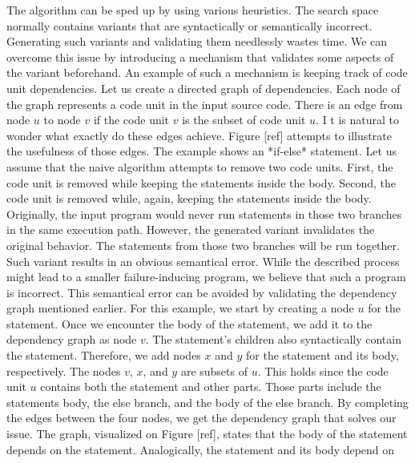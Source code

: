 The algorithm can be sped up by using various heuristics. 
The search space normally contains variants that are syntactically or 
semantically incorrect. 
Generating such variants and validating them needlessly wastes time. 
We can overcome this issue by introducing a mechanism that validates some 
aspects of the variant beforehand. 
An example of such a mechanism is keeping track of code unit dependencies. 
Let us create a directed graph of dependencies. 
Each node of the graph represents a code unit in the input source code. 
There is an edge from node $u$ to node $v$ if the code unit $v$ is 
the subset of code unit $u$. I
t is natural to wonder what exactly do these edges achieve. 
Figure [ref] attempts to illustrate the usefulness of those edges. 
The example shows an *if-else* statement. 
Let us assume that the naive algorithm attempts to remove two code units. 
First, the code unit  is removed while keeping the statements 
inside the body. 
Second, the code unit  is removed while, again, keeping 
the statements inside the body. 
Originally, the input program would never run statements in those two 
branches in the same execution path. 
However, the generated variant invalidates the original behavior. 
The statements from those two branches will be run together. 
Such variant results in an obvious semantical error. 
While the described process might lead to a smaller failure-inducing program, 
we believe that such a program is incorrect. 
This semantical error can be avoided by validating the dependency graph 
mentioned earlier.
For this example, we start by creating a node $u$ for the  
statement. 
Once we encounter the body of the  statement, we add it to 
the dependency graph as node $v$. 
The  statement's children also syntactically contain 
the  statement. 
Therefore, we add nodes $x$ and $y$ for the  statement and 
its body, respectively. 
The nodes $v$, $x$, and $y$ are subsets of $u$.  
This holds since the code unit $u$ contains both the  
statement and other parts. 
Those parts include the statements body, the else branch, and the body of 
the else branch. 
By completing the edges between the four nodes, we get the dependency graph 
that solves our issue. 
The graph, visualized on Figure [ref], states that the body of 
the  statement depends on the  statement. 
Analogically, the  statement and its body depend on 
